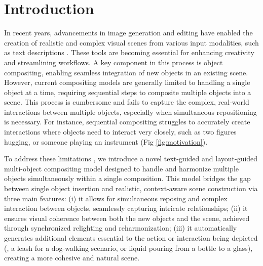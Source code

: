 \section{Introduction}
\label{sec:intro}

In recent years, advancements in image generation and editing have enabled the creation of realistic and complex visual scenes from various input modalities, such as text descriptions \cite{rombach2022ldm,podell2023sdxl,esser2024scaling}. These tools are becoming essential for enhancing creativity and streamlining workflows. A key component in this process is object compositing, enabling seamless integration of new objects in an existing scene. However, current compositing models \cite{song2024imprint,tarres2024thinking,yang2023paintbyexample,zhang2023controlcom,chen2023anydoor} are generally limited to handling a single object at a time, requiring sequential steps to composite multiple objects into a scene. This process is cumbersome and fails to capture the complex, real-world interactions between multiple objects, especially when simultaneous repositioning is necessary. For instance, sequential compositing struggles to accurately create interactions where objects need to interact very closely, such as two figures hugging, or someone playing an instrument (Fig \ref{fig:motivation}). %

To address these limitations , we introduce a novel text-guided and layout-guided multi-object compositing model designed to handle and harmonize multiple objects simultaneously within a single composition. This model bridges the gap between single object insertion and realistic, context-aware scene construction via three main features: (i) it allows for simultaneous reposing and complex interaction between objects, seamlessly capturing intricate relationships; (ii) it ensures visual coherence between both the new objects and the scene, achieved through synchronized relighting and reharmonization;  (iii) it automatically generates additional elements essential to the action or interaction being depicted (\eg, a leash for a dog-walking scenario, or liquid pouring from a bottle to a glass), creating a more cohesive and natural scene.


